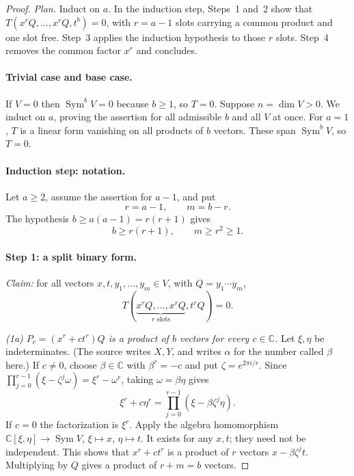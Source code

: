 \documentclass[11pt]{article}
\theoremstyle{remark}
\DeclareMathOperator{\Sym}{Sym}
\newcommand{\C}{\mathbb C}
\begin{document}
\begin{proof}
\emph{Plan.} Induct on $a$. In the induction step, Steps~1 and~2 show that
$T(x^rQ,\ldots,x^rQ,t^b)=0$, with $r=a-1$ slots carrying a common product
and one slot free. Step~3 applies the induction hypothesis to those $r$
slots. Step~4 removes the common factor $x^r$ and concludes.

\paragraph{Trivial case and base case.}
If $V=0$ then $\Sym^bV=0$ because $b\ge1$, so $T=0$. Suppose
$n=\dim V>0$. We induct on $a$, proving the assertion for all admissible
$b$ and all $V$ at once. For $a=1$, $T$ is a linear form vanishing on all
products of $b$ vectors. These span $\Sym^bV$, so $T=0$.

\paragraph{Induction step: notation.}
Let $a\ge2$, assume the assertion for $a-1$, and put
\begin{equation}\label{eq:rm}
 r=a-1,\qquad m=b-r.
\end{equation}
The hypothesis $b\ge a(a-1)=r(r+1)$ gives
\begin{equation}\label{eq:range}
 b\ge r(r+1),\qquad m\ge r^2\ge1.
\end{equation}

\paragraph{Step 1: a split binary form.}
\emph{Claim:} for all vectors $x,t,y_1,\ldots,y_m\in V$, with
$Q=y_1\cdots y_m$,
\begin{equation}\label{eq:binary}
 T(\underbrace{x^rQ,\ldots,x^rQ}_{r\text{ slots}},t^rQ)=0.
\end{equation}

\emph{(1a) $P_c=(x^r+ct^r)Q$ is a product of $b$ vectors for every
$c\in\C$.}
Let $\xi,\eta$ be indeterminates. (The source writes $X,Y$, and writes
$\alpha$ for the number called $\beta$ here.) If $c\ne0$, choose
$\beta\in\C$ with $\beta^r=-c$ and put $\zeta=e^{2\pi i/r}$. Since
$\prod_{j=0}^{r-1}(\xi-\zeta^j\omega)=\xi^r-\omega^r$, taking
$\omega=\beta\eta$ gives
\[
 \xi^r+c\eta^r=\prod_{j=0}^{r-1}(\xi-\beta\zeta^j\eta).
\]
If $c=0$ the factorization is $\xi^r$. Apply the algebra homomorphism
$\C[\xi,\eta]\to\Sym V$, $\xi\mapsto x$, $\eta\mapsto t$. It exists for
any $x,t$; they need not be independent. This shows that $x^r+ct^r$ is a
product of $r$ vectors $x-\beta\zeta^jt$. Multiplying by $Q$ gives a
product of $r+m=b$ vectors.


\end{proof}
\end{document}
